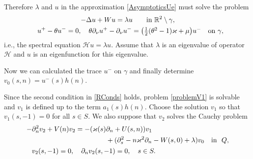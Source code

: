 \documentclass[reqno]{amsart}
\theoremstyle{plain}
\numberwithin{equation}{section}
\renewcommand{\kappa}{\varkappa}
\newcommand{\Real}{\mathbb R}
\newcommand{\cH}{\mathcal{H}}
\newcommand{\pte}{\partial_n}
\begin{document}
Therefore  $\lambda$ and $u$ in the approximation \eqref{AsymptoticsUe} must solve the problem
\begin{gather}\label{LimitProblemEq}
-\Delta u+Wu=\lambda u \qquad \hbox{in  } \Real^2\setminus \gamma,
\\ \label{RConds}
 \phantom{-}u^+-\theta u^-=0,  \quad
\theta\partial_\nu u^+-\partial_\nu u^-
=\big(\textstyle\frac{1}{2}(\theta^2-1)\kappa+\mu \big) u^- \quad \hbox{on } \gamma,
\end{gather}
i.e., the spectral equation $\cH u=\lambda u$. 
Assume that $\lambda$ is an eigenvalue of operator $\cH$ and $u$  is an eigenfunction for this eigenvalue.

Now we can calculated the trace $u^-$ on $\gamma$ and  finally determine $v_0(s,n)=u^-(s)h(n)$.

Since the second condition in \eqref{RConds} holds,
problem \eqref{problemV1} is solvable and $v_1$ is defined up to the term $a_1(s) h(n)$.
Choose the solution $v_1$ so that $v_1(s,-1)=0$ for all $s\in S$.
We also suppose that $v_2$ solves the Cauchy problem
\begin{align}
&\begin{aligned}\label{problemV2eqn}
  -\pte^2 v_2+V(n)v_2=-(\kappa(s)&\pte +U(s,n)) v_1\\
  &+(\partial^2_s-n\kappa^2\partial_n-W(s,0)+\lambda)v_0
  \quad \hbox{in \ } Q,
\end{aligned}
\\\label{problemV2conditions}
 & \phantom{-} v_2(s, -1)=0,
 \quad
 \partial_n v_2(s, -1)=0, \quad s\in S.
\end{align}
\end{document}
